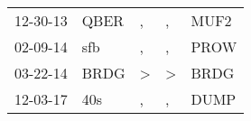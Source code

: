 \begin{supertabular}{lllll}
 12-30-13 &  QBER &             , &             , &  MUF2 \\
 02-09-14 &   sfb &             , &             , &  PROW \\
 03-22-14 &  BRDG &  \textgreater &  \textgreater &  BRDG \\
 12-03-17 &   40s &             , &             , &  DUMP \\
\end{supertabular}
